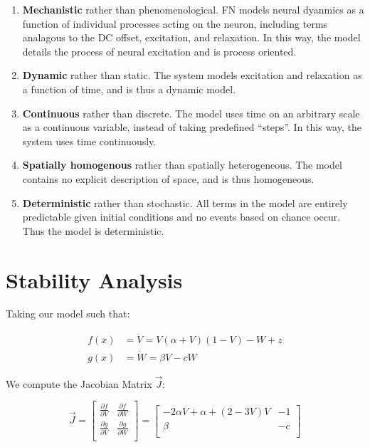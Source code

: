 \documentclass[11pt]{report}
\begin{document}
\begin{enumerate}
	\item \textbf{Mechanistic} rather than phenomenological. FN models neural dyanmics as a function of individual processes acting on the neuron, including terms analagous to the DC offset, excitation, and relaxation. In this way, the model details the process of neural excitation and is process oriented.
	\item \textbf{Dynamic} rather than static. The system models excitation and relaxation as a function of time, and is thus a dynamic model.
	\item \textbf{Continuous} rather than discrete. The model uses time on an arbitrary scale as a continuous variable, instead of taking predefined ``steps''. In this way, the system uses time continuously. 
	\item \textbf{Spatially homogenous} rather than spatially heterogeneous. The model contains no explicit description of space, and is thus homogeneous. 
	\item \textbf{Deterministic} rather than stochastic. All terms in the model are entirely predictable given initial conditions and no events based on chance occur. Thus the model is deterministic. 
\end{enumerate}

\section{Stability Analysis} %
\label{sub:stability_analysis}

Taking our model such that:

$$\begin{aligned}
f(x) &= \dot{V} = V(\alpha + V)(1-V) -W +z \\
g(x) &= \dot{W} = \beta V -cW
\end{aligned}
$$

We compute the Jacobian Matrix $\vec{J}$:


$$
\vec{J} = \begin{bmatrix}
    \frac{\partial f}{\partial{V}} & \frac{\partial f}{\partial{W}} \\
    \frac{\partial g}{\partial{V}} & \frac{\partial g}{\partial{W}} \\
\end{bmatrix} = 
\begin{bmatrix}
    −2\alpha V+\alpha+(2 - 3V)V & -1 \\
    \beta & -c \\
\end{bmatrix}
$$
\end{document}
